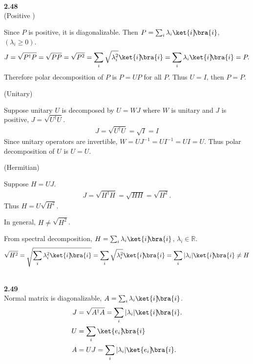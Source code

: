 \documentclass[10pt]{book}
\newcommand{\kb}[1]{\ket{#1}\hspace{-1mm} \bra{#1}} %
\newcommand{\kbt}[2]{\ket{#1}\hspace{-1mm} \bra{#2}} %
\newcommand{\Textbf}[1]{\hspace{3mm}\\ \textbf{#1}\\}
\begin{document}
	
	
	\Textbf{2.48}
	
	(Positive )
	
	Since $P$ is positive, it is diagonalizable. Then $P = \sum_i \lambda_i \kb{i}$, $(\lambda_i \geq 0)$.
	\begin{equation}
\begin{aligned}
		J = \sqrt{P^\dagger P} = \sqrt{P P} = \sqrt{P^2} = \sum_i \sqrt{\lambda_i^2} \kb{i} = \sum_i \lambda_i \kb{i} = P.
	\end{aligned}
\end{equation}
	Therefore polar decomposition of $P$ is $P = UP$ for all $P$.
	Thus $U = I$, then $P = P$.
	
	
	\vspace{5mm}
	(Unitary)
	
	Suppose unitary $U$ is decomposed by $U = WJ$ where $W$ is unitary and $J$ is positive, $J = \sqrt{U^\dagger U}$.
	\begin{equation}
\begin{aligned}
		J = \sqrt{U^\dagger U} = \sqrt{I} = I
	\end{aligned}
\end{equation}
	Since unitary operators are invertible, $W = UJ^{-1} = UI^{-1} = UI = U$.
	Thus polar decomposition of $U$ is $U = U$.
	
	
	\vspace{5mm}
	(Hermitian)
	
	Suppose $H = UJ$.
	\begin{equation}
\begin{aligned}
		J = \sqrt{H^\dagger H} = \sqrt{HH} = \sqrt{H^2}.
	\end{aligned}
\end{equation}
	Thus $H = U\sqrt{H^2}$.
	

		In general, $H \neq \sqrt{H^2}$.
		
		From spectral decomposition, $H = \sum_i \lambda_i \kb{i}$, $\lambda_i \in \mathds{R}$.
		\begin{equation}
\begin{aligned}
			\sqrt{H^2} = \sqrt{ \sum_i \lambda_i^2 \kb{i} }
			=
			\sum_i
			\sqrt{
				\lambda_i^2
			} \kb{i}
			= \sum_i | \lambda_i | \kb{i} \neq H
		\end{aligned}
\end{equation}

	
	
	\Textbf{2.49}
	
	Normal matrix is diagonalizable, $A = \sum_i \lambda_i \kb{i}$.
	\begin{equation}
\begin{aligned}
		J &= \sqrt{A^\dagger A} = \sum_i | \lambda_i | \kb{i}.\\
		U &= \sum_i \kbt{e_i}{i}\\
		A &= UJ = \sum_i |\lambda_i| \kbt{e_i}{i}.
	\end{aligned}
\end{equation}
	
\end{document}
